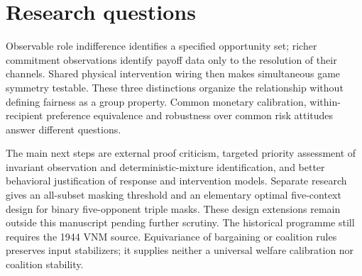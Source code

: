 \section{Research questions}
Observable role indifference identifies a specified opportunity set; richer
commitment observations identify payoff data only to the resolution of their
channels. Shared physical intervention wiring then makes simultaneous game
symmetry testable. These three distinctions organize the relationship without
defining fairness as a group property. Common monetary calibration,
within-recipient preference equivalence and robustness over common risk
attitudes answer different questions.

The main next steps are external proof criticism, targeted priority assessment
of invariant observation and deterministic-mixture identification, and better
behavioral justification of response and intervention models. Separate research gives an all-subset masking threshold and an
elementary optimal five-context design for binary five-opponent triple masks.
These design extensions remain outside this manuscript pending further scrutiny. The historical programme still requires the 1944 VNM source.
Equivariance of bargaining or coalition rules preserves input stabilizers;
it supplies neither a universal welfare calibration nor coalition stability.
